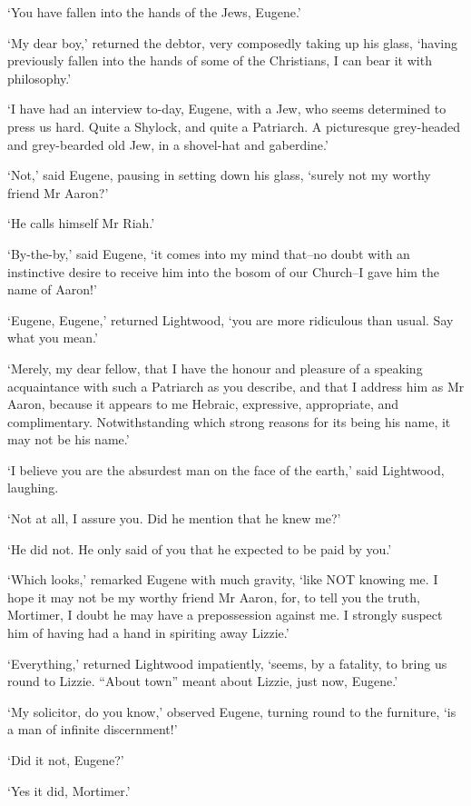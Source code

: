 ‘You have fallen into the hands of the Jews, Eugene.’

‘My dear boy,’ returned the debtor, very composedly taking up his glass,
‘having previously fallen into the hands of some of the Christians, I
can bear it with philosophy.’

‘I have had an interview to-day, Eugene, with a Jew, who seems
determined to press us hard. Quite a Shylock, and quite a Patriarch. A
picturesque grey-headed and grey-bearded old Jew, in a shovel-hat and
gaberdine.’

‘Not,’ said Eugene, pausing in setting down his glass, ‘surely not my
worthy friend Mr Aaron?’

‘He calls himself Mr Riah.’

‘By-the-by,’ said Eugene, ‘it comes into my mind that--no doubt with an
instinctive desire to receive him into the bosom of our Church--I gave
him the name of Aaron!’

‘Eugene, Eugene,’ returned Lightwood, ‘you are more ridiculous than
usual. Say what you mean.’

‘Merely, my dear fellow, that I have the honour and pleasure of a
speaking acquaintance with such a Patriarch as you describe, and that I
address him as Mr Aaron, because it appears to me Hebraic, expressive,
appropriate, and complimentary. Notwithstanding which strong reasons for
its being his name, it may not be his name.’

‘I believe you are the absurdest man on the face of the earth,’ said
Lightwood, laughing.

‘Not at all, I assure you. Did he mention that he knew me?’

‘He did not. He only said of you that he expected to be paid by you.’

‘Which looks,’ remarked Eugene with much gravity, ‘like NOT knowing me.
I hope it may not be my worthy friend Mr Aaron, for, to tell you the
truth, Mortimer, I doubt he may have a prepossession against me. I
strongly suspect him of having had a hand in spiriting away Lizzie.’

‘Everything,’ returned Lightwood impatiently, ‘seems, by a fatality,
to bring us round to Lizzie. “About town” meant about Lizzie, just now,
Eugene.’

‘My solicitor, do you know,’ observed Eugene, turning round to the
furniture, ‘is a man of infinite discernment!’

‘Did it not, Eugene?’

‘Yes it did, Mortimer.’

